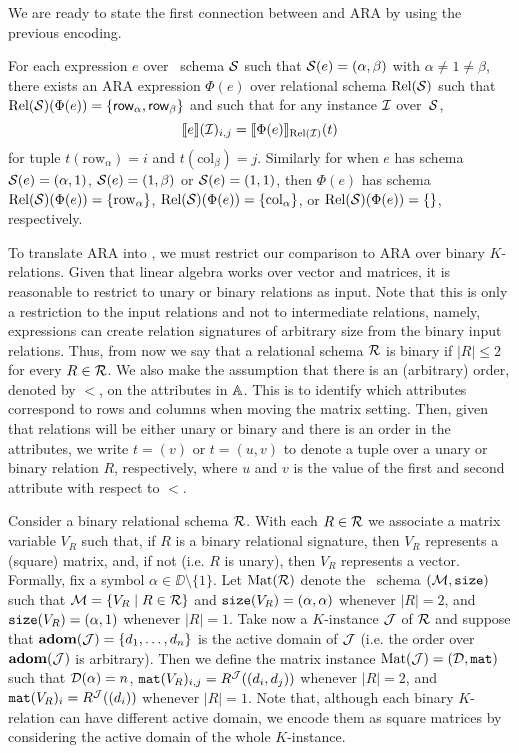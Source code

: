 We are ready to state the first connection between \langsum and ARA by using the previous encoding.
\begin{proposition}
	For each \langsum expression $e$ over \lang \ schema $\mathcal{S}$ such that $\mathcal{S}(e)=(\alpha,\beta)$ with $\alpha\neq 1\neq\beta$, there exists an ARA expression $\Phi(e)$ over relational schema $\text{Rel}(\mathcal{S})$ such that $\text{Rel}(\mathcal{S})(\Phi(e))=\{\mathsf{row}_\alpha,\mathsf{row}_\beta\}$ and 
	such that for any instance $\mathcal{I}$ over~$\mathcal{S}$,
	$$
	\llbracket e \rrbracket(\mathcal{I})_{i,j}=\llbracket \Phi(e) \rrbracket_{\text{Rel}(\mathcal{I})}(t)
	$$
	for tuple $t(\mathrm{row}_\alpha)=i$ and $t(\mathrm{col}_\beta)=j$. Similarly for when $e$ has schema $\mathcal{S}(e)=(\alpha,1)$, $\mathcal{S}(e)=(1,\beta)$ or $\mathcal{S}(e)=(1,1)$, then $\Phi(e)$ has schema $\text{Rel}(\mathcal{S})(\Phi(e))=\{\mathrm{row}_\alpha\}$,
	$\text{Rel}(\mathcal{S})(\Phi(e))=\{\mathrm{col}_\alpha\}$, or
	$\text{Rel}(\mathcal{S})(\Phi(e))=\{\}$, respectively.
\end{proposition}
To translate ARA into \langsum, we must restrict our comparison to ARA over binary $K$-relations. Given that linear algebra works over vector and matrices, it is reasonable to restrict to unary or binary relations as input. Note that this is only a restriction to the input relations and not to intermediate relations, namely, expressions can create relation signatures of arbitrary size from the binary input relations. Thus, from now we say that a relational schema $\mathcal{R}$ is binary if $|R| \leq 2$ for every $R \in \mathcal{R}$. We also make the assumption that there is an (arbitrary) order, denoted by $<$, on the attributes in $\mathbb{A}$. 
This is to identify which attributes correspond to rows and columns when moving the matrix setting. 
Then, given that relations will be  either unary or binary and there is an order in the attributes, we write $t = (v)$ or $t = (u,v)$ to denote a tuple over a unary or binary relation $R$, respectively, where $u$ and $v$ is the value of the first and second attribute with respect to $<$.

Consider a binary relational schema $\mathcal{R}$. With each $R\in \mathcal{R}$ we associate a matrix variable $V_R$ such that, if $R$ is a binary relational signature, then $V_R$ represents a (square) matrix, and, if not (i.e. $R$ is unary), then $V_R$ represents a vector. Formally, fix a symbol $\alpha \in \DD \setminus \{1\}$. Let $\text{Mat}(\mathcal{R})$ denote the \lang \ schema
$(\mathcal{M},\texttt{size})$ such that $\mathcal{M} = \{ V_R \mid R \in \mathcal{R}\}$ and $\texttt{size}(V_R) = (\alpha, \alpha)$ whenever $|R| = 2$, and $\texttt{size}(V_R) = (\alpha, 1)$ whenever $|R|=1$. 
Take now a $K$-instance $\mathcal{J}$ of $\mathcal{R}$ and suppose that $\mathbf{adom}(\mathcal{J}) = \{d_1, \ldots, d_n\}$ is the active domain of $\mathcal{J}$ (i.e. the order over $\mathbf{adom}(\mathcal{J})$ is arbitrary). Then we define the matrix instance $\text{Mat}(\mathcal{J}) = (\mathcal{D},\texttt{mat})$ such that $\mathcal{D}(\alpha) = n$, $\texttt{mat}(V_R)_{i,j} = R^{\mathcal{J}}((d_i, d_j))$ whenever $|R|=2$, and $\texttt{mat}(V_R)_{i} = R^{\mathcal{J}}((d_i))$ whenever $|R|=1$. 
Note that, although each binary $K$-relation can have different active domain, we encode them as square matrices by considering the active domain of the whole $K$-instance.

